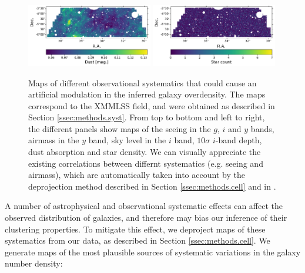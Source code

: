 \documentclass[a4paper,11pt]{article}
\begin{document}
\begin{figure}
      \includegraphics[width=0.49\textwidth]{figures/syst_dust.pdf}
      \includegraphics[width=0.49\textwidth]{figures/syst_star.pdf}
      \caption{Maps of different observational systematics that could cause an artificial modulation in the inferred galaxy overdensity. The maps correspond to the XMMLSS field, and were obtained as described in Section \ref{ssec:methods.syst}. From top to bottom and left to right, the different panels show maps of the seeing in the $g$, $i$ and $y$ bands, airmass in the $y$ band, sky level in the $i$ band, $10\sigma$ $i$-band depth, dust absorption and star density. We can visually appreciate the existing correlations between differnt systematics (e.g. seeing and airmass), which are automatically taken into account by the deprojection method described in Section \ref{ssec:methods.cell} and in \cite{2019MNRAS.484.4127A}.}
      \label{fig:sysmap}
    \end{figure}
    A number of astrophysical and observational systematic effects can affect the observed distribution of galaxies, and therefore may bias our inference of their clustering properties. To mitigate this effect, we deproject maps of these systematics from our data, as described in Section \ref{ssec:methods.cell}. We generate maps of the most plausible sources of systematic variations in the galaxy number density:
\end{document}
